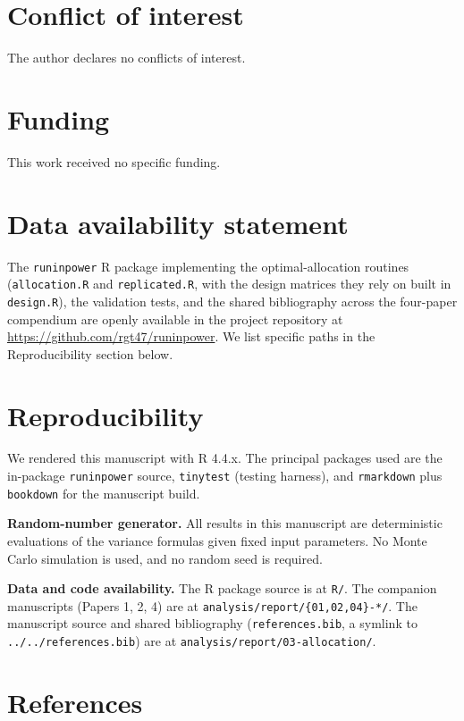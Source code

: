 \documentclass[
  11pt,
]{article}
\begin{document}
\section{Conflict of interest}\label{conflict-of-interest}

The author declares no conflicts of interest.

\section{Funding}\label{funding}

This work received no specific funding.

\section{Data availability statement}\label{data-availability-statement}

The \texttt{runinpower} R package implementing the
optimal-allocation routines (\texttt{allocation.R} and
\texttt{replicated.R}, with the design matrices they rely on
built in \texttt{design.R}), the validation tests, and the shared
bibliography across the four-paper compendium are openly
available in the project repository at
\url{https://github.com/rgt47/runinpower}.
We list specific paths in the Reproducibility section
below.

\section{Reproducibility}\label{reproducibility}

We rendered this manuscript with R 4.4.x. The principal
packages used are the in-package \texttt{runinpower} source,
\texttt{tinytest} (testing harness), and \texttt{rmarkdown} plus
\texttt{bookdown} for the manuscript build.

\textbf{Random-number generator.} All results in this
manuscript are deterministic evaluations of the variance
formulas given fixed input parameters. No Monte Carlo
simulation is used, and no random seed is required.

\textbf{Data and code availability.} The R package source is at
\texttt{R/}. The companion manuscripts (Papers 1, 2, 4) are at
\texttt{analysis/report/\{01,02,04\}-*/}. The manuscript source and
shared bibliography (\texttt{references.bib}, a symlink to
\texttt{../../references.bib}) are at
\texttt{analysis/report/03-allocation/}.

\section{References}\label{references}
\end{document}
